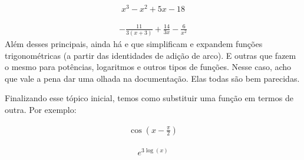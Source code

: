 \documentclass[letterpaper,10pt,english]{jupyterBook}
\begin{document}
\begin{equation*}
\begin{split}\displaystyle x^{3} - x^{2} + 5 x - 18\end{split}
\end{equation*}
\begin{sphinxVerbatim}[commandchars=\\\{\}]
    
\end{sphinxVerbatim}
\begin{equation*}
\begin{split}\displaystyle - \frac{11}{3 \left(x + 3\right)} + \frac{14}{3 x} - \frac{6}{x^{2}}\end{split}
\end{equation*}
\sphinxAtStartPar
Além desses principais, ainda há  e  que simplificam e expandem funções trigonométricas (a partir das identidades de adição de arco). E outras que fazem o mesmo para potências, logaritmos e outros tipos de funções. Nesse caso, acho que vale a pena dar uma olhada na documentação. Elas todas são bem parecidas.

\sphinxAtStartPar
Finalizando esse tópico inicial, temos como substituir uma função em termos de outra. Por exemplo:

\begin{sphinxVerbatim}[commandchars=\\\{\}]
\end{sphinxVerbatim}
\begin{equation*}
\begin{split}\displaystyle \cos{\left(x - \frac{\pi}{2} \right)}\end{split}
\end{equation*}
\begin{sphinxVerbatim}[commandchars=\\\{\}]
\end{sphinxVerbatim}
\begin{equation*}
\begin{split}\displaystyle e^{3 \log{\left(x \right)}}\end{split}
\end{equation*}
\end{document}
